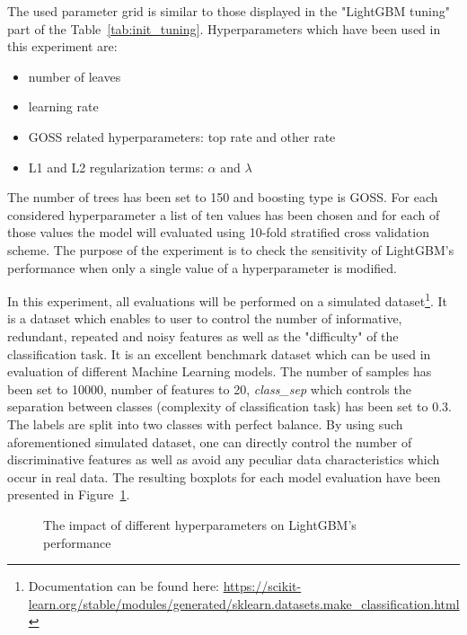 \documentclass[magisterska, english]{pwr_wmat_praca_dyplomowa}
\theoremstyle{plain}
\numberwithin{theorem}{chapter}
\theoremstyle{definition}
\numberwithin{theorem}{chapter}
\begin{document}
The used parameter grid is similar to those displayed in the "LightGBM tuning" part of the Table~\ref{tab:init_tuning}. Hyperparameters which have been used in this experiment are:

\begin{itemize}
    \item number of leaves
    \item learning rate
    \item GOSS related hyperparameters: top rate and other rate
    \item L1 and L2 regularization terms: $\alpha$ and $\lambda$
\end{itemize}


The number of trees has been set to 150 and boosting type is GOSS. For each considered hyperparameter a list of ten values has been chosen and for each of those values the model will evaluated using 10-fold stratified cross validation scheme. The purpose of the experiment is to check the sensitivity of LightGBM's performance when only a single value of a hyperparameter is modified. 

In this experiment, all evaluations will be performed on a simulated dataset\footnote{Documentation can be found here: \url{https://scikit-learn.org/stable/modules/generated/sklearn.datasets.make_classification.html}}. It is a dataset which enables to user to control the number of informative, redundant, repeated and noisy features as well as the "difficulty" of the classification task. It is an excellent benchmark dataset which can be used in evaluation of different Machine Learning models. The number of samples has been set to 10000, number of features to 20, \emph{class\_sep} which controls the separation between classes (complexity of classification task) has been set to 0.3. The labels are split into two classes with perfect balance. By using such aforementioned simulated dataset, one can directly control the number of discriminative features as well as avoid any peculiar data characteristics which occur in real data. The resulting boxplots for each model evaluation have been presented in Figure~\ref{fig:lightgbm_tuning}.

\begin{figure}[H]
	\centering
	\caption{The impact of different hyperparameters on LightGBM's performance}
	\label{fig:lightgbm_tuning}
\end{figure}
\end{document}
